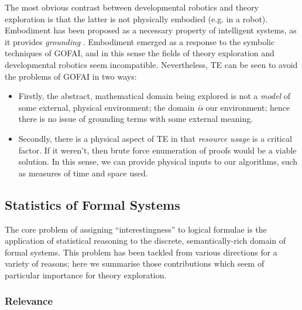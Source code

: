 \documentclass[]{article}
\begin{document}
The most obvious contrast between developmental robotics and theory exploration is that the latter is not physically embodied (e.g. in a robot). Embodiment has been proposed as a necessary property of intelligent systems, as it provides \emph{grounding} \cite{anderson2003embodied}. Embodiment emerged as a response to the symbolic techniques of GOFAI, and in this sense the fields of theory exploration and developmental robotics seem incompatible. Nevertheless, TE can be seen to avoid the problems of GOFAI in two ways:

\begin{itemize}

  \item Firstly, the abstract, mathematical domain being explored is not a \emph{model} of some external, physical environment; the domain \emph{is} our environment; hence there is no issue of grounding terms with some external meaning.

  \item Secondly, there is a physical aspect of TE in that \emph{resource usage} is a critical factor. If it weren't, then brute force enumeration of proofs would be a viable solution. In this sense, we can provide physical inputs to our algorithms, such as measures of time and space used.

\end{itemize}

\iffalse

\subsubsection{Universal Drives}

PhysRevLett.110.168702.pdf
Omohundro? Too physical.
\emph{Universal drives} are those

\fi

\subsection{Statistics of Formal Systems}

The core problem of assigning ``interestingness'' to logical formulae is the application of statistical reasoning to the discrete, semantically-rich domain of formal systems. This problem has been tackled from various directions for a variety of reasons; here we summarise those contributions which seem of particular importance for theory exploration.

\subsubsection{Relevance}
\end{document}
